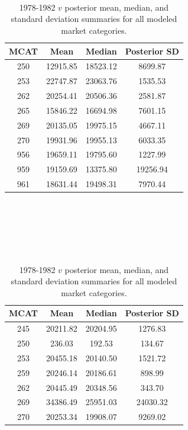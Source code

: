 \documentclass[12pt]{article}
\begin{document}
%
\begin{table}[h!]
\begin{minipage}[c]{0.45\textwidth}
\centering
$~$\\$~$\\$~$\\
\begin{tabular}{cccc}
\hline
MCAT & Mean & Median & Posterior SD     \\ \hline
250 & 12915.85 & 18523.12 & 8699.87     \\
253 & 22747.87 & 23063.76 & 1535.53     \\
262 & 20254.41 & 20506.36 & 2581.87     \\
265 & 15846.22 & 16694.98 & 7601.15     \\
269 & 20135.05 & 19975.15 & 4667.11     \\
270 & 19931.96 & 19955.13 & 6033.35     \\
956 & 19659.11 & 19795.60 & 1227.99     \\
959 & 19159.69 & 13375.80 & 19256.94    \\
961 & 18631.44 & 19498.31 & 7970.44     \\
\hline
\end{tabular}
$~$\\$~$\\$~$\\
\caption{1978-1982 $v$ posterior mean, median, and standard deviation 
summaries for all modeled market categories.}
\label{v78}
\end{minipage}
\begin{minipage}[c]{0.09\textwidth}
$~$
\end{minipage}
\begin{minipage}[c]{0.45\textwidth}
\centering
\begin{tabular}{cccc}
\hline
MCAT & Mean & Median & Posterior SD     \\ \hline
245 & 20211.82 & 20204.95 & 1276.83     \\
250 & 236.03   & 192.53   & 134.67      \\
253 & 20455.18 & 20140.50 & 1521.72     \\
259 & 20246.14 & 20186.61 & 898.99      \\
262 & 20445.49 & 20348.56 & 343.70      \\
269 & 34386.49 & 25951.03 & 24030.32    \\
270 & 20253.34 & 19908.07 & 9269.02     \\

\end{tabular}
\end{minipage}
\end{table}
\end{document}
